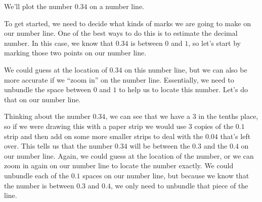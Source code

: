 \documentclass{ximera}
\begin{document}
\begin{example}
We'll plot the number $0.34$ on a number line.

To get started, we need to decide what kinds of marks we are going to make on our number line. One of the best ways to do this is to estimate the decimal number. In this case, we know that $0.34$ is between $0$ and $1$, so let's start by marking those two points on our number line.

\begin{image}
\end{image}

We could guess at the location of $0.34$ on this number line, but we can also be more accurate if we ``zoom in'' on the number line. Essentially, we need to unbundle the space between $0$ and $1$ to help us to locate this number. Let's do that on our number line.

\begin{image}
\end{image}

Thinking about the number $0.34$, we can see that we have a $3$ in the tenths place, so if we were drawing this with a paper strip we would use $3$ copies of the $0.1$ strip and then add on some more smaller strips to deal with the $0.04$ that's left over. This tells us that the number $0.34$ will be between the $0.3$ and the $0.4$ on our number line. Again, we could guess at the location of the number, or we can zoom in again on our number line to locate the number exactly. We could unbundle each of the $0.1$ spaces on our number line, but because we know that the number is between $0.3$ and $0.4$, we only need to unbundle that piece of the line.


\end{example}
\end{document}
